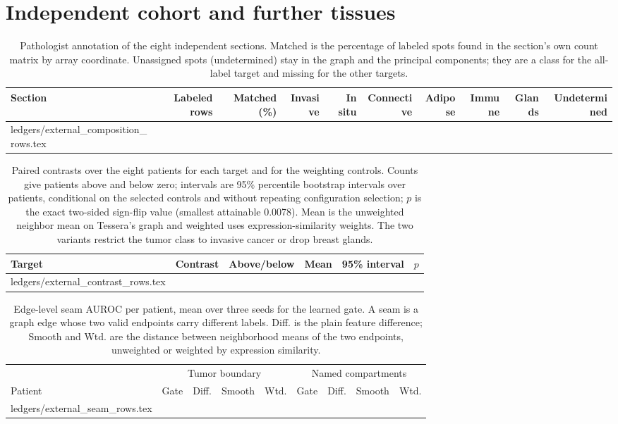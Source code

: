 \documentclass[11pt]{article}
\makeatletter
\let\tableinput\@@input
\makeatother
\begin{document}
\section*{Independent cohort and further tissues}
\begin{table}[H]\centering\scriptsize\setlength{\tabcolsep}{4pt}
\caption{Pathologist annotation of the eight independent sections. Matched is the percentage of labeled spots found in the section's own count matrix by array coordinate. Unassigned spots (undetermined) stay in the graph and the principal components; they are a class for the all-label target and missing for the other targets.}\label{tab:external-composition}
\begin{tabular}{lrrrrrrrrr}\toprule
Section & Labeled rows & Matched (\%) & Invasive & In situ & Connective & Adipose & Immune & Glands & Undetermined\\\midrule
\tableinput ledgers/external_composition_rows.tex
\bottomrule\end{tabular}\end{table}
\begin{table}[H]\centering\scriptsize\setlength{\tabcolsep}{4pt}
\caption{Paired contrasts over the eight patients for each target and for the weighting controls. Counts give patients above and below zero; intervals are 95\% percentile bootstrap intervals over patients, conditional on the selected controls and without repeating configuration selection; \(p\) is the exact two-sided sign-flip value (smallest attainable 0.0078). Mean is the unweighted neighbor mean on Tessera's graph and weighted uses expression-similarity weights. The two variants restrict the tumor class to invasive cancer or drop breast glands.}\label{tab:external-contrasts}
\begin{tabular}{llrrrr}\toprule
Target & Contrast & Above/below & Mean & 95\% interval & \(p\)\\\midrule
\tableinput ledgers/external_contrast_rows.tex
\bottomrule\end{tabular}\end{table}
\begin{table}[H]\centering\scriptsize\setlength{\tabcolsep}{4pt}
\caption{Edge-level seam AUROC per patient, mean over three seeds for the learned gate. A seam is a graph edge whose two valid endpoints carry different labels. Diff. is the plain feature difference; Smooth and Wtd. are the distance between neighborhood means of the two endpoints, unweighted or weighted by expression similarity.}\label{tab:external-seams}
\begin{tabular}{lrrrrrrrr}\toprule
& \multicolumn{4}{c}{Tumor boundary} & \multicolumn{4}{c}{Named compartments}\\\cmidrule(lr){2-5}\cmidrule(lr){6-9}
Patient & Gate & Diff. & Smooth & Wtd. & Gate & Diff. & Smooth & Wtd.\\\midrule
\tableinput ledgers/external_seam_rows.tex
\bottomrule\end{tabular}\end{table}
\end{document}
